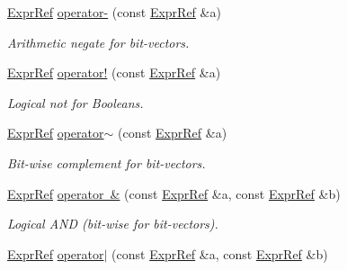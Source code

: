 \begin{DoxyCompactItemize}
\mbox{\label{namespaceilang_ad48e47567031b28aa1b58b82e40f60d1}} 
\mbox{\hyperlink{classilang_1_1_expr_ref}{Expr\+Ref}} \mbox{\hyperlink{namespaceilang_ad48e47567031b28aa1b58b82e40f60d1}{operator-\/}} (const \mbox{\hyperlink{classilang_1_1_expr_ref}{Expr\+Ref}} \&a)
\begin{DoxyCompactList}\small\item\em Arithmetic negate for bit-\/vectors. \end{DoxyCompactList}\item 
\mbox{\label{namespaceilang_abdc8204049fd3920b75bd255c3c18f74}} 
\mbox{\hyperlink{classilang_1_1_expr_ref}{Expr\+Ref}} \mbox{\hyperlink{namespaceilang_abdc8204049fd3920b75bd255c3c18f74}{operator!}} (const \mbox{\hyperlink{classilang_1_1_expr_ref}{Expr\+Ref}} \&a)
\begin{DoxyCompactList}\small\item\em Logical not for Booleans. \end{DoxyCompactList}\item 
\mbox{\label{namespaceilang_a2fb9f43d4ffd7d0cb2061095d1986cbf}} 
\mbox{\hyperlink{classilang_1_1_expr_ref}{Expr\+Ref}} \mbox{\hyperlink{namespaceilang_a2fb9f43d4ffd7d0cb2061095d1986cbf}{operator$\sim$}} (const \mbox{\hyperlink{classilang_1_1_expr_ref}{Expr\+Ref}} \&a)
\begin{DoxyCompactList}\small\item\em Bit-\/wise complement for bit-\/vectors. \end{DoxyCompactList}\item 
\mbox{\label{namespaceilang_a6c7282e60e89ef9907cc25254e9dd522}} 
\mbox{\hyperlink{classilang_1_1_expr_ref}{Expr\+Ref}} \mbox{\hyperlink{namespaceilang_a6c7282e60e89ef9907cc25254e9dd522}{operator \&}} (const \mbox{\hyperlink{classilang_1_1_expr_ref}{Expr\+Ref}} \&a, const \mbox{\hyperlink{classilang_1_1_expr_ref}{Expr\+Ref}} \&b)
\begin{DoxyCompactList}\small\item\em Logical A\+ND (bit-\/wise for bit-\/vectors). \end{DoxyCompactList}\item 
\mbox{\label{namespaceilang_a7e4d71727922a8e7cd35bf2f9814c6f8}} 
\mbox{\hyperlink{classilang_1_1_expr_ref}{Expr\+Ref}} \mbox{\hyperlink{namespaceilang_a7e4d71727922a8e7cd35bf2f9814c6f8}{operator$\vert$}} (const \mbox{\hyperlink{classilang_1_1_expr_ref}{Expr\+Ref}} \&a, const \mbox{\hyperlink{classilang_1_1_expr_ref}{Expr\+Ref}} \&b)

\end{DoxyCompactItemize}
